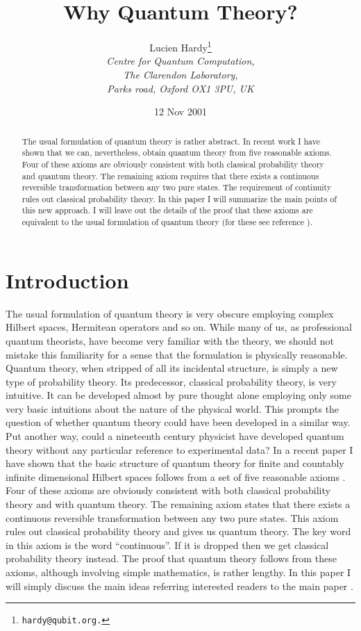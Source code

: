 \documentclass[12pt]{article}
\title{\large\textbf{Why Quantum Theory?}}
\author{\large Lucien Hardy\thanks{\texttt{hardy@qubit.org.}}\\
\textit{Centre for Quantum Computation,}\\
\textit{The Clarendon Laboratory,}\\
\textit{Parks road, Oxford OX1 3PU, UK}}
\begin{document}
\date{\normalsize 12 Nov 2001}


\maketitle

\begin{abstract}
The usual formulation of quantum theory is rather abstract.  In recent
work I have shown that we can, nevertheless, obtain quantum theory from
five reasonable axioms.  Four of these axioms are obviously consistent
with both classical probability theory and quantum theory.  The
remaining axiom requires that there exists a continuous reversible
transformation between any two pure states.  The requirement of
continuity rules out classical probability theory.  In this paper I will
summarize the main points of this new approach.  I will leave out the
details of the proof that these axioms are equivalent to the usual
formulation of quantum theory (for these see reference \cite{Hardy1}).
\end{abstract}

\newpage

\section{Introduction}

The usual formulation of quantum theory is
very obscure employing complex Hilbert spaces, Hermitean operators and
so on.  While many of us, as professional quantum theorists, have
become very familiar with the theory, we should not mistake this familiarity
for a sense that the formulation is physically  reasonable.
Quantum theory, when stripped of all
its incidental structure, is simply a new type of probability theory.
Its predecessor, classical probability theory, is very intuitive.  It
can be developed almost by pure thought alone employing only some very
basic intuitions about the nature of the physical world.  This prompts
the question of whether quantum theory could have been developed in a
similar way. Put another way, could a nineteenth century physicist have
developed quantum theory without any particular reference to
experimental data?  In a recent paper
I have shown that the basic structure of quantum theory
for finite and countably infinite dimensional Hilbert spaces follows
from a set of five reasonable axioms \cite{Hardy1}.  Four of these
axioms are obviously consistent with both classical probability theory
and with quantum theory.  The remaining axiom states that there exists a
continuous reversible transformation between any two pure states.  This
axiom rules out classical probability theory and gives us quantum
theory.  The key word in this axiom is the word ``continuous''.  If it
is dropped then we get classical probability theory instead.
The proof that quantum theory follows from these axioms, although
involving simple mathematics, is rather lengthy.  In this paper I will
simply discuss the main ideas referring interested readers
to the main paper \cite{Hardy1}.
\end{document}
